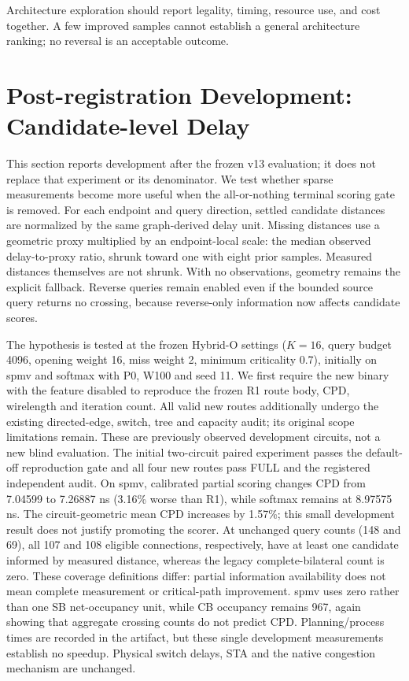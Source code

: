 \documentclass[conference,10pt]{IEEEtran}
\begin{document}
Architecture exploration should report legality, timing, resource use, and cost together. A few improved samples cannot establish a general architecture ranking; no reversal is an acceptable outcome.


\section{Post-registration Development: Candidate-level Delay}
This section reports development after the frozen v13 evaluation; it does not replace that experiment or its denominator. We test whether sparse measurements become more useful when the all-or-nothing terminal scoring gate is removed. For each endpoint and query direction, settled candidate distances are normalized by the same graph-derived delay unit. Missing distances use a geometric proxy multiplied by an endpoint-local scale: the median observed delay-to-proxy ratio, shrunk toward one with eight prior samples. Measured distances themselves are not shrunk. With no observations, geometry remains the explicit fallback. Reverse queries remain enabled even if the bounded source query returns no crossing, because reverse-only information now affects candidate scores.

The hypothesis is tested at the frozen Hybrid-O settings ($K=16$, query budget 4096, opening weight 16, miss weight 2, minimum criticality 0.7), initially on spmv and softmax with P0, W100 and seed 11. We first require the new binary with the feature disabled to reproduce the frozen R1 route body, CPD, wirelength and iteration count. All valid new routes additionally undergo the existing directed-edge, switch, tree and capacity audit; its original scope limitations remain. These are previously observed development circuits, not a new blind evaluation. The initial two-circuit paired experiment passes the default-off reproduction gate and all four new routes pass FULL and the registered independent audit. On spmv, calibrated partial scoring changes CPD from 7.04599 to 7.26887 ns (3.16\% worse than R1), while softmax remains at 8.97575 ns. The circuit-geometric mean CPD increases by 1.57\%; this small development result does not justify promoting the scorer. At unchanged query counts (148 and 69), all 107 and 108 eligible connections, respectively, have at least one candidate informed by measured distance, whereas the legacy complete-bilateral count is zero. These coverage definitions differ: partial information availability does not mean complete measurement or critical-path improvement. spmv uses zero rather than one SB net-occupancy unit, while CB occupancy remains 967, again showing that aggregate crossing counts do not predict CPD. Planning/process times are recorded in the artifact, but these single development measurements establish no speedup. Physical switch delays, STA and the native congestion mechanism are unchanged.
\end{document}
